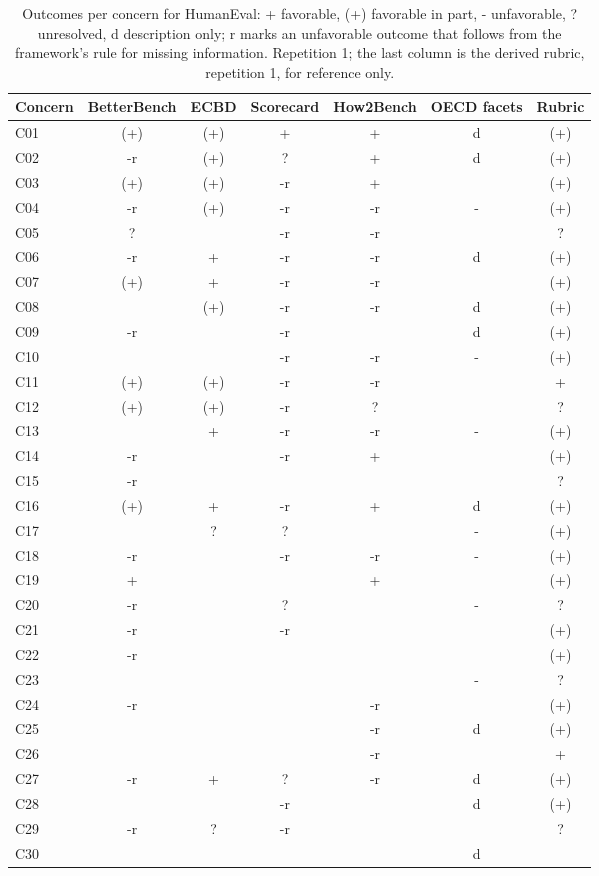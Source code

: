 \begin{table}[t]
\caption{Outcomes per concern for HumanEval: + favorable, (+) favorable in part, - unfavorable, ? unresolved, d description only; r marks an unfavorable outcome that follows from the framework's rule for missing information. Repetition 1; the last column is the derived rubric, repetition 1, for reference only.}
\label{tab:grid-humaneval}
\small\centering\begin{tabular}{lcccccc}\toprule
Concern & BetterBench & ECBD & Scorecard & How2Bench & OECD facets & Rubric \\
\midrule
C01 & (+) & (+) & + & + & d & (+) \\
C02 & -r & (+) & ? & + & d & (+) \\
C03 & (+) & (+) & -r & + &  & (+) \\
C04 & -r & (+) & -r & -r & - & (+) \\
C05 & ? &  & -r & -r &  & ? \\
C06 & -r & + & -r & -r & d & (+) \\
C07 & (+) & + & -r & -r &  & (+) \\
C08 &  & (+) & -r & -r & d & (+) \\
C09 & -r &  & -r &  & d & (+) \\
C10 &  &  & -r & -r & - & (+) \\
C11 & (+) & (+) & -r & -r &  & + \\
C12 & (+) & (+) & -r & ? &  & ? \\
C13 &  & + & -r & -r & - & (+) \\
C14 & -r &  & -r & + &  & (+) \\
C15 & -r &  &  &  &  & ? \\
C16 & (+) & + & -r & + & d & (+) \\
C17 &  & ? & ? &  & - & (+) \\
C18 & -r &  & -r & -r & - & (+) \\
C19 & + &  &  & + &  & (+) \\
C20 & -r &  & ? &  & - & ? \\
C21 & -r &  & -r &  &  & (+) \\
C22 & -r &  &  &  &  & (+) \\
C23 &  &  &  &  & - & ? \\
C24 & -r &  &  & -r &  & (+) \\
C25 &  &  &  & -r & d & (+) \\
C26 &  &  &  & -r &  & + \\
C27 & -r & + & ? & -r & d & (+) \\
C28 &  &  & -r &  & d & (+) \\
C29 & -r & ? & -r &  &  & ? \\
C30 &  &  &  &  & d &  \\
\bottomrule\end{tabular}
\end{table}

